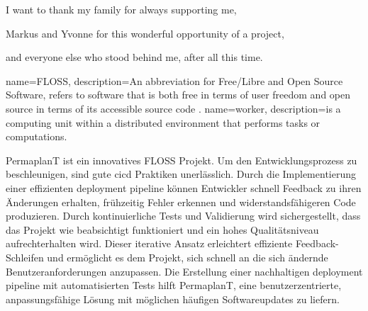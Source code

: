 \documentclass[draft, final]{vutinfth} %
\begin{document}
\epigraphfontsize{\small\itshape}
\setlength\epigraphwidth{14cm}
\setlength\epigraphrule{0pt}

\frontmatter %

\addstatementpage


\begin{acknowledgements*}

I want to thank my family for always supporting me,

Markus and Yvonne for this wonderful opportunity of a project,

and everyone else who stood behind me, after all this time.

\end{acknowledgements*}

{
  name={FLOSS},
  description={An abbreviation for Free/Libre and Open Source Software, refers to software that is both free in terms of user freedom and open source in terms of its accessible source code \cite{FLOSS/FOSS}.}
}
{
  name={worker},
  description={is a computing unit within a distributed environment that performs tasks or computations.}
}

\begin{kurzfassung}
    PermaplanT ist ein innovatives \gls{FLOSS} Projekt.
    Um den Entwicklungsprozess zu beschleunigen, sind gute \gls{cicd} Praktiken unerlässlich.
    Durch die Implementierung einer effizienten deployment pipeline können Entwickler schnell Feedback zu ihren Änderungen erhalten, frühzeitig Fehler erkennen und widerstandsfähigeren Code produzieren.
    Durch kontinuierliche Tests und Validierung wird sichergestellt, dass das Projekt wie beabsichtigt funktioniert und ein hohes Qualitätsniveau aufrechterhalten wird.
    Dieser iterative Ansatz erleichtert effiziente Feedback-Schleifen und ermöglicht es dem Projekt, sich schnell an die sich ändernde Benutzeranforderungen anzupassen.
    Die Erstellung einer nachhaltigen deployment pipeline mit automatisierten Tests hilft PermaplanT, eine benutzerzentrierte, anpassungsfähige Lösung mit möglichen häufigen Softwareupdates zu liefern.
\end{kurzfassung}
\end{document}
